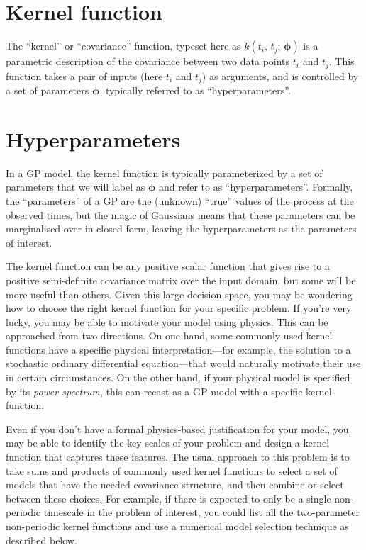 \documentclass[letterpaper]{ar-1col}
\newcommand{\suz}[1]{\textcolor{magenta}{#1}}
\newcommand{\hyperparams}{\ensuremath{\boldsymbol{\phi}}}
\begin{document}
\begin{textbox}[htb]
  \section{Kernel function}
  The ``kernel'' or ``covariance'' function, typeset here as $k(t_i,\,t_j;\,\hyperparams)$ is a parametric description of the covariance between two data points $t_i$ and $t_j$. This function takes a pair of inputs (here $t_i$ and $t_j$) as arguments, and is controlled by a set of parameters $\hyperparams$, typically referred to as ``hyperparameters''.

  \vspace{1.5em}

  \section{Hyperparameters}
  In a GP model, the kernel function is typically parameterized by a set of parameters that we will label as $\hyperparams$ and refer to as ``hyperparameters''.
  Formally, the ``parameters'' of a GP are the (unknown) ``true'' values of the process at the observed times, but the magic of Gaussians means that these parameters can be marginalised over in closed form, leaving the hyperparameters as the parameters of interest.
\end{textbox}

The kernel function can be any positive scalar function that gives rise to a positive semi-definite covariance matrix over the input domain, but some will be more useful than others.
Given this large decision space, you may be wondering how to choose the right kernel function for your specific problem.
If you're very lucky, you may be able to motivate your model using physics.
This can be approached from two directions.
On one hand, some commonly used kernel functions have a specific physical interpretation---for example, the solution to a stochastic ordinary differential equation---that would naturally motivate their use in certain circumstances.
On the other hand, if your physical model is specified by its \emph{power spectrum}, this can recast as a GP model with a specific kernel function.

Even if you don't have a formal physics-based justification for your model, you may be able to identify the key scales of your problem and design a kernel function that captures these features.
The usual approach to this problem is to take sums and products of commonly used kernel functions to select a set of  models that have the needed covariance structure, and then combine or select between these choices.
For example, if there is expected to only be a single non-periodic timescale in the problem of interest, you could list all the two-parameter non-periodic kernel functions and use a numerical model selection technique as described below.
\end{document}

